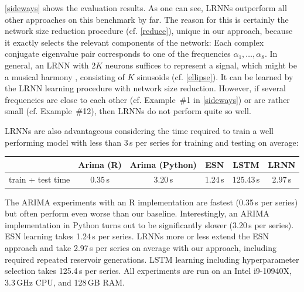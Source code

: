 \documentclass{sn-jnl}
\theoremstyle{definition}
\begin{document}
\cref{sideways} shows the evaluation results. As one can see, LRNNs outperform
all other approaches on this benchmark by far. The reason for this is certainly
the network size reduction procedure (cf. \cref{reduce}), unique in our approach,
because it exactly selects the relevant components of the network: Each complex
conjugate eigenvalue pair corresponds to one of the frequencies $\alpha_1,\dots,\alpha_8$.
In general, an LRNN with $2K$ neurons suffices to represent a signal, which
might be a musical harmony \citep{Sto17b}, consisting of $K$ sinusoids (cf.
\cref{ellipse}). It can be learned by the LRNN learning procedure with network
size reduction. However, if several frequencies are close to each other (cf.
Example~\#1 in \cref{sideways}) or are rather small (cf. Example~\#12), then
LRNNs do not perform quite so well.

LRNNs are also advantageous considering the time required to train a well
performing model with less than 3\,s per series for training and testing on average:
\begin{center}
\smallskip
\begin{tabular}{cccccc}
\toprule
& Arima (R) & Arima (Python)  & ESN & LSTM & LRNN\\ \midrule
train + test time & 0.35\,s & 3.20\,s & 1.24\,s & 125.43\,s & 2.97\,s \\ \bottomrule
\end{tabular}
\smallskip
\end{center}
The ARIMA experiments with an R implementation are fastest (0.35\,s
per series) but often perform even worse than our baseline. Interestingly, an
ARIMA implementation in Python turns out to be significantly slower (3.20\,s per series).
ESN learning takes 1.24\,s per series. LRNNs more or less extend the ESN
approach and take 2.97\,s per series on average with our approach, 
including required repeated reservoir generations. LSTM learning including hyperparameter
selection takes 125.4\,s per series. All experiments are run on an Intel
i9-10940X, 3.3\,GHz CPU, and 128\,GB RAM.

	
\end{document}
